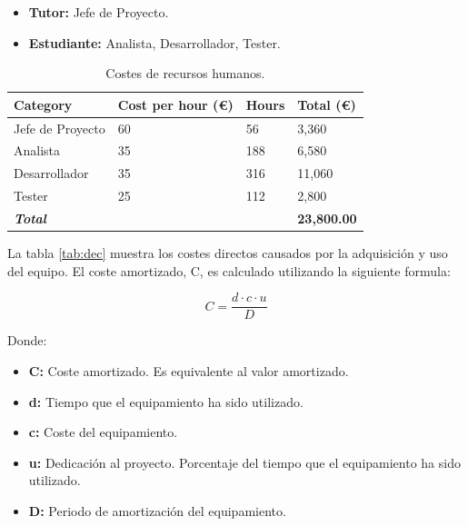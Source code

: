 \begin{itemize}

\item \textbf{Tutor:} Jefe de Proyecto.

\item \textbf{Estudiante:} Analista, Desarrollador, Tester.

\end{itemize} 

\begin{center}
\begin{table}[htbp]
\centering
\begin{tabular}{@{}p{3cm} R{3.5cm} R{2.2cm} R{2.4cm}@{}} 
\toprule
\textbf{Category} & \textbf{Cost per hour (\euro)} & \textbf{Hours} & \textbf{Total (\euro)} \\
\midrule
Jefe de Proyecto					& 60 						& 56			& 3,360 \\
Analista			 				& 35							& 188		& 6,580 \\
Desarrollador		 				& 35							& 316		& 11,060 \\
Tester		 					& 25							& 112		& 2,800 \\
\midrule
\textbf{\textit{Total}}			&							&			& \textbf{23,800.00}\\
\bottomrule
\end{tabular}
\caption{Costes de recursos humanos.}
\label{tab:dhrc}
\end{table}
\end{center}

La tabla \ref{tab:dec} muestra los costes directos causados por la adquisición y uso del equipo. El coste amortizado, C, es calculado utilizando la siguiente formula:

\begin{equation}
  C = \frac{d \cdot c \cdot u}{D}
\label{eq:costs}
\end{equation}

Donde:

\begin{itemize}

\item \textbf{C:} Coste amortizado. Es equivalente al valor amortizado.

\item \textbf{d:} Tiempo que el equipamiento ha sido utilizado.

\item \textbf{c:} Coste del equipamiento. 

\item \textbf{u:} Dedicación al proyecto. Porcentaje del tiempo que el equipamiento ha sido utilizado.

\item \textbf{D:} Periodo de amortización del equipamiento.

\end{itemize}

